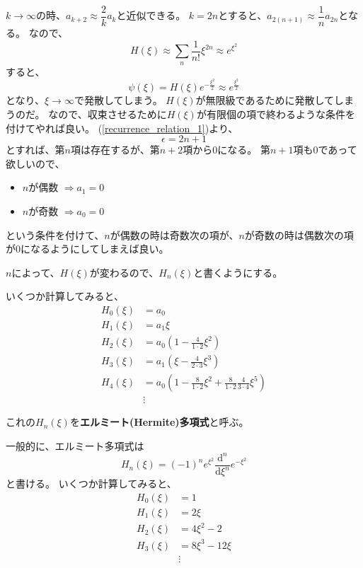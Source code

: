 $k \to \infty$の時、$a_{k+2} \approx \dfrac{2}{k}a_k$と近似できる。
$k = 2n$とすると、$a_{2(n+1)} \approx \dfrac{1}{n}a_{2n}$となる。
なので、
\begin{equation}
	H(\xi) \approx \sum_{n}\dfrac{1}{n!}\xi^{2n} \approx e^{\xi^2}
\end{equation}
すると、
\begin{equation}
	\psi(\xi) = H(\xi)e^{-\frac{\xi^2}{2}} \approx e^{\frac{\xi^2}{2}}
\end{equation}
となり、$\xi \to \infty$で発散してしまう。
$H(\xi)$が無限級であるために発散してしまうのだ。
なので、収束させるために$H(\xi)$が有限個の項で終わるような条件を付けてやれば良い。
(\ref{recurrence_relation_1})より、
\begin{equation}
	\label{eps_requirement}
	\epsilon = 2n + 1
\end{equation}
とすれば、第$n$項は存在するが、第$n+2$項から$0$になる。
第$n+1$項も$0$であって欲しいので、
\begin{itemize}
	\item $n$が偶数 $\Rightarrow a_1 = 0$
	\item $n$が奇数 $\Rightarrow a_0 = 0$
\end{itemize}
という条件を付けて、$n$が偶数の時は奇数次の項が、$n$が奇数の時は偶数次の項が$0$になるようにしてしまえば良い。

$n$によって、$H(\xi)$が変わるので、$H_n(\xi)$と書くようにする。

いくつか計算してみると、
$$
\begin{aligned} H_{0}(\xi) &=a_{0} \\ H_{1}(\xi) &=a_{1} \xi \\ H_{2}(\xi) &=a_{0}\left(1-\frac{4}{1 \cdot 2} \xi^{2}\right) \\ H_{3}(\xi) &=a_{1}\left(\xi-\frac{4}{2 \cdot 3} \xi^{3}\right) \\ H_{4}(\xi) &=a_{0}\left(1-\frac{8}{1 \cdot 2} \xi^{2}+\frac{8}{1 \cdot 2} \frac{4}{3 \cdot 4} \xi^{5}\right) \\ & \vdots
\end{aligned}
$$

これの$H_n(\xi)$を{\bf エルミート(Hermite)多項式}と呼ぶ。

一般的に、エルミート多項式は
\begin{equation}
	H_{n}(\xi)=(-1)^{n} e^{\xi^{2}} \frac{\mathrm{d}^{n}}{\mathrm{d} \xi^{n}} e^{-\xi^{2}}
\end{equation}
と書ける。
いくつか計算してみると、
\begin{equation}
\begin{aligned}
	H_{0}(\xi) &= 1 \\
	H_{1}(\xi) &= 2 \xi \\
	H_{2}(\xi) &= 4 \xi^{2}-2 \\
	H_{3}(\xi) &= 8 \xi^{3}-12 \xi \\
						 & \vdots \end{aligned}
\end{equation}

